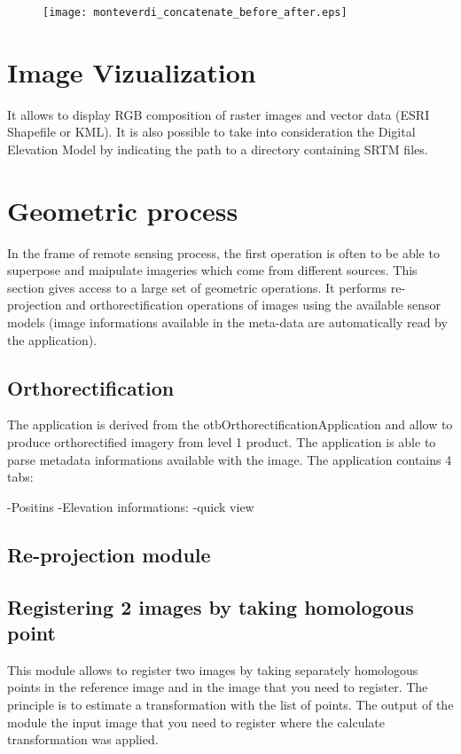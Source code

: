 \documentclass{InsightSoftwareGuide}
\begin{document}
\begin{figure}
   \center
   \texttt{[image: monteverdi\_concatenate\_before\_after.eps]}
   \label{fig:concatenate}
\end{figure}
 
\section{Image Vizualization}
It allows to display RGB composition of raster images and vector data (ESRI Shapefile or KML). It is also possible to take 
into consideration the Digital Elevation Model by indicating the path to a directory containing SRTM files. 
\section{Geometric process}
In the frame of remote sensing process, the first operation is often to be able to superpose and maipulate imageries which 
come from different sources.
This section gives access to a large set of geometric operations.
It performs re-projection and orthorectification operations of images using the available sensor models 
(image informations available in the meta-data are automatically read by the application).  
\subsection{Orthorectification}
The application is derived from the otbOrthorectificationApplication and allow to produce orthorectified imagery from level 1 
product.
The application is able to parse metadata informations available with the image. The application contains 4 tabs:

-Positins
-Elevation informations: 
-quick view

\subsection{Re-projection module}
\subsection{Registering 2 images by taking homologous point}
This module allows to register two images by taking separately homologous points in the reference image and in the image 
that you need to register. The principle is to estimate a transformation with the list of points.
The output of the module the input image that you need to register where the calculate transformation was applied. 
\end{document}
